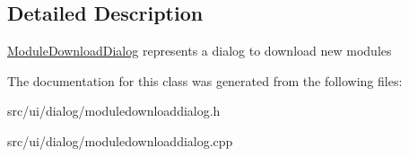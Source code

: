 \subsection{Detailed Description}
\hyperlink{classModuleDownloadDialog}{ModuleDownloadDialog} represents a dialog to download new modules 

The documentation for this class was generated from the following files:\begin{DoxyCompactItemize}
\item 
src/ui/dialog/moduledownloaddialog.h\item 
src/ui/dialog/moduledownloaddialog.cpp\end{DoxyCompactItemize}
